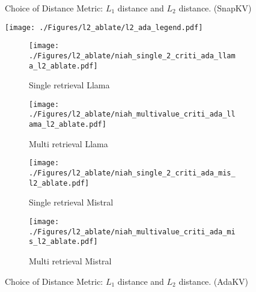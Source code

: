 {\begin{figure*}[t!]
	\vspace{-0.3cm}
	\caption{Choice of Distance Metric: $L_1$ distance and $L_2$ distance. (SnapKV)}
	\label{fig:choice_distance_metric_snap}
	
	
	\centering
	\begin{minipage}{\linewidth}
		\centering
		\texttt{[image: ./Figures/l2\_ablate/l2\_ada\_legend.pdf]}
	\end{minipage}
	\begin{subfigure}[b]{0.24\linewidth}
		\centering
		\texttt{[image: ./Figures/l2\_ablate/niah\_single\_2\_criti\_ada\_llama\_l2\_ablate.pdf]}
		\vspace{-0.5cm}
		\caption{\centering  Single retrieval \newline Llama}
		\label{subfig:ada_llama_l2_single}
	\end{subfigure}
	\begin{subfigure}[b]{0.24\linewidth}
		\centering
		\texttt{[image: ./Figures/l2\_ablate/niah\_multivalue\_criti\_ada\_llama\_l2\_ablate.pdf]}
		\vspace{-0.5cm}
		\caption{\centering  Multi retrieval \newline Llama}
		\label{subfig:ada_llama_l2_multi}
	\end{subfigure}
	\begin{subfigure}[b]{0.24\linewidth}
		\centering
		\texttt{[image: ./Figures/l2\_ablate/niah\_single\_2\_criti\_ada\_mis\_l2\_ablate.pdf]}
		\vspace{-0.5cm}
		\caption{\centering  Single retrieval \newline Mistral}
		\label{subfig:ada_mis_l2_single}
	\end{subfigure}
	\begin{subfigure}[b]{0.24\linewidth}
		\centering
		\texttt{[image: ./Figures/l2\_ablate/niah\_multivalue\_criti\_ada\_mis\_l2\_ablate.pdf]}
		\vspace{-0.5cm}
		\caption{\centering  Multi retrieval \newline Mistral}
		\label{subfig:ada_mis_l2_multi}
	\end{subfigure}
	
	\vspace{-0.3cm}
	\caption{Choice of Distance Metric: $L_1$ distance and $L_2$ distance. (AdaKV)}
	\label{fig:choice_distance_metric_ada}
	
	
	
\end{figure*}
}
